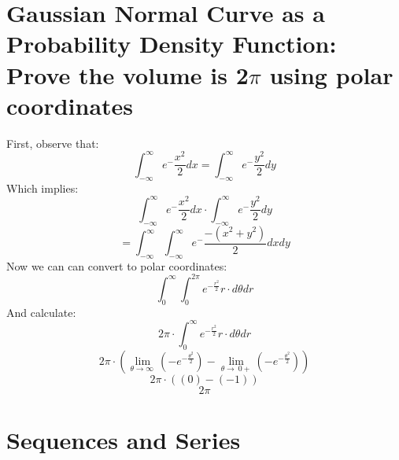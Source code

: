 \documentclass{article}
\begin{document}
\section{Gaussian Normal Curve as a Probability Density Function: Prove the volume is 2$\pi$ using polar coordinates}
    First, observe that:
    \[ \int_{-\infty}^{\infty} e^-\frac{x^2}{2} dx = \int_{-\infty}^{\infty} e^-\frac{y^2}{2} dy\]
    Which implies:
    \[ \int_{-\infty}^{\infty} e^-\frac{x^2}{2} dx \cdot \int_{-\infty}^{\infty} e^-\frac{y^2}{2} dy \]
    \[ = \int_{-\infty}^{\infty} \int_{-\infty}^{\infty} e^-\frac{-(x^2+y^2)}{2} dx dy \]
    Now we can can convert to polar coordinates:
    \[ \int_{0}^{\infty} \int_{0}^{2\pi} e^{-\frac{r^2}{2}} r \cdot d\theta dr \]
    And calculate:
    \[ 2\pi \cdot \int_{0}^{\infty} e^{-\frac{r^2}{2}} r \cdot d\theta dr\]
    \[ 2\pi \cdot (\lim _{\theta \to \infty \:}\left(-e^{-\frac{\theta ^2}{2}}\right) - \lim _{\theta \to \:0+}\left(-e^{-\frac{\theta ^2}{2}}\right))\]
    \[ 2\pi \cdot ((0)-\left(-1\right))\]
    \[ 2\pi\]

\section{Sequences and Series}
\end{document}
